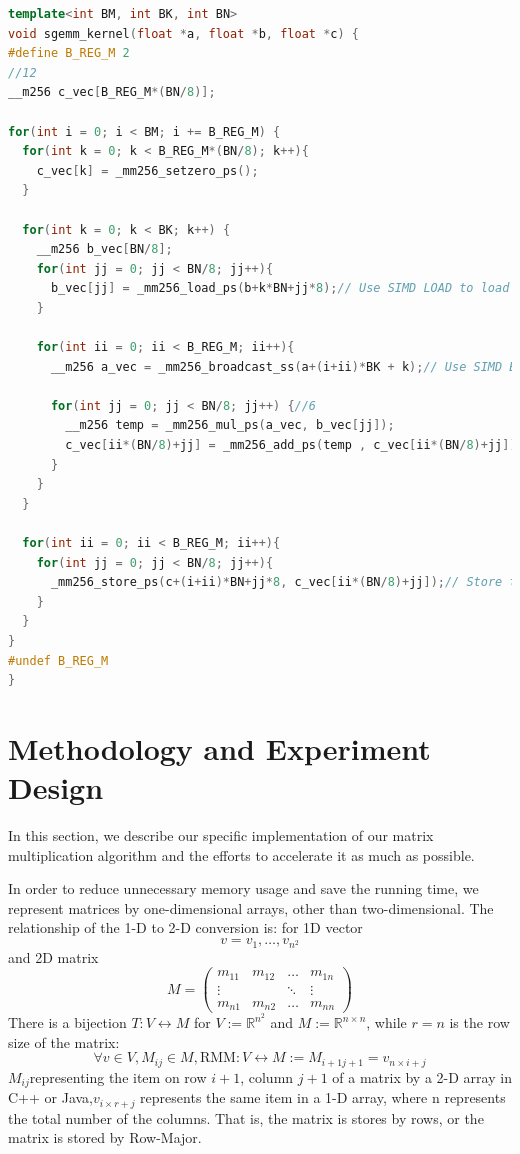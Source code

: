 \documentclass[UTF8]{ctexart}
\begin{document}
\begin{lstlisting}[language=C++,style=C++]
  template<int BM, int BK, int BN>
void sgemm_kernel(float *a, float *b, float *c) {
#define B_REG_M 2
//12
__m256 c_vec[B_REG_M*(BN/8)];

for(int i = 0; i < BM; i += B_REG_M) {
  for(int k = 0; k < B_REG_M*(BN/8); k++){
    c_vec[k] = _mm256_setzero_ps();
  }

  for(int k = 0; k < BK; k++) {
    __m256 b_vec[BN/8];
    for(int jj = 0; jj < BN/8; jj++){
      b_vec[jj] = _mm256_load_ps(b+k*BN+jj*8);// Use SIMD LOAD to load data into XMM registers
    }

    for(int ii = 0; ii < B_REG_M; ii++){
      __m256 a_vec = _mm256_broadcast_ss(a+(i+ii)*BK + k);// Use SIMD BROADCAST to broadcast data along with the internal bus

      for(int jj = 0; jj < BN/8; jj++) {//6
        __m256 temp = _mm256_mul_ps(a_vec, b_vec[jj]);
        c_vec[ii*(BN/8)+jj] = _mm256_add_ps(temp , c_vec[ii*(BN/8)+jj]);// SIMD add operation
      }
    }
  }

  for(int ii = 0; ii < B_REG_M; ii++){
    for(int jj = 0; jj < BN/8; jj++){
      _mm256_store_ps(c+(i+ii)*BN+jj*8, c_vec[ii*(BN/8)+jj]);// Store the data from XMM registers to RAM
    }
  }
}
#undef B_REG_M
}
\end{lstlisting}

\section{Methodology and Experiment Design}
\label{sec::ExpDesign}
In this section, we describe our specific implementation of our matrix
multiplication algorithm and the efforts to accelerate it as much as
possible.

In order to reduce unnecessary memory usage and save the running time,
we represent matrices by one-dimensional arrays, other than
two-dimensional. The relationship of the 1-D to 2-D conversion is: for 1D vector
\begin{equation}
  v={v_{1},\dots,v_{n^{2}}}
\end{equation}
and 2D matrix
\begin{equation}
  M=\left(
  \begin{matrix}
    m_{11} & m_{12} & \dots  & m_{1n} \\
    \vdots &        & \ddots & \vdots \\
    m_{n1} & m_{n2} & \dots  & m_{nn}
  \end{matrix}
  \right)
\end{equation}
There is a bijection \(T:V\leftrightarrow M\) for \(V:=\mathbb{R}^{n^{2}}\) and \(M:=\mathbb{R}^{n\times n}\), while \(r=n\) is the row size of the matrix:
\begin{equation}
  \forall v\in V,M_{ij}\in M,\mathrm{RMM}:V\leftrightarrow M:=M_{i+1j+1}=v_{n\times i+j}
\end{equation}
\(M_{ij}\)representing the item on row \(i+1\), column \(j+1\) of a
matrix by a 2-D array in C++ or Java,\(v_{i\times r+j}\) represents the same item in a 1-D
array, where n represents the total number of the columns. That is, the
matrix is stores by rows, or the matrix is stored by Row-Major.
\end{document}
